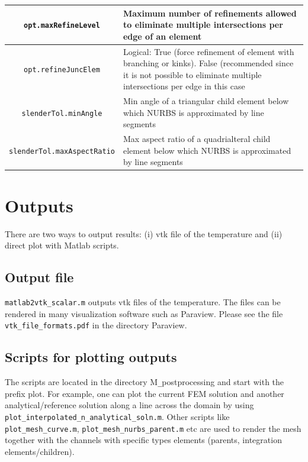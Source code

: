 \documentclass[11pt,letterpaper]{article}
\begin{document}
\begin{table}[!h]
\begin{tabular}{|c|L|}
\hline
\texttt{opt.maxRefineLevel} & Maximum  number of refinements allowed to eliminate multiple intersections per edge of an element\\
\hline
\texttt{opt.refineJuncElem} & Logical: True (force refinement of element with branching or kinks). 
False (recommended since it is not possible to eliminate multiple intersections per edge in this case\\
\hline
\texttt{slenderTol.minAngle} & Min angle of a triangular child element below which NURBS is approximated by line segments\\
\hline
\texttt{slenderTol.maxAspectRatio} & Max aspect ratio of a quadrialteral child element below which NURBS is approximated by line segments\\
\hline
\end{tabular}
\end{table}

\FloatBarrier
\section{Outputs}
There are two ways to output results: (i) vtk file of the temperature and (ii) direct plot with Matlab scripts.
\subsection{Output file}
\texttt{matlab2vtk\_scalar.m} outputs vtk files of the temperature. The files can be rendered in many visualization software such as Paraview. Please see the file \texttt{vtk\_file\_formats.pdf} in the directory Paraview.

\subsection{Scripts for plotting outputs}
The scripts are located in the directory M\texttt{\_}postprocessing and start with the prefix plot. For example, one can plot the current FEM solution and another analytical/reference solution along a line across the domain by using \texttt{plot\_interpolated\_n\_analytical\_soln.m}. Other scripts like \texttt{plot\_mesh\_curve.m}, \texttt{plot\_mesh\_nurbs\_parent.m} etc are used to render the mesh together with the channels with specific types elements (parents, integration elements/children).
 
\end{document}
